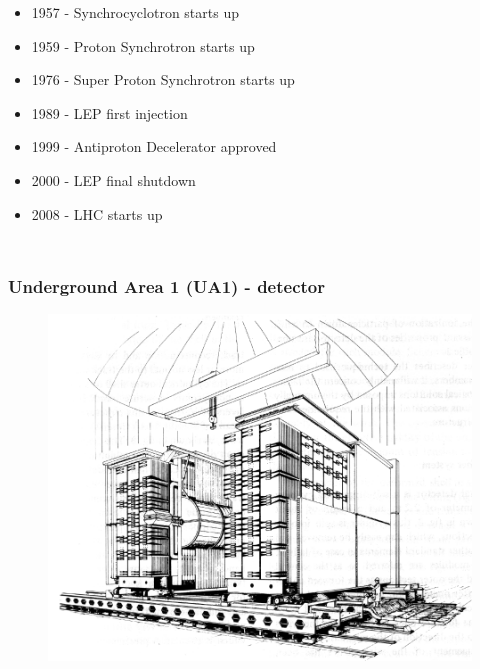 \documentclass[xcolor=table]{beamer}
\begin{document}
\begin{frame}
\begin{columns}
\begin{itemize}
\item 1957 - Synchrocyclotron starts up
\item 1959 - Proton Synchrotron starts up
\item 1976 - Super Proton Synchrotron starts up
\item 1989 - LEP first injection
\item 1999 - Antiproton Decelerator approved
\item 2000 - LEP final shutdown
\item 2008 - LHC starts up
\end{itemize}

\end{columns}


\end{frame}


\begin{frame}
\frametitle{Underground Area 1 (UA1) - detector}
\fontsize{9pt}{12}\selectfont

\begin{figure}[h]
\centering
\includegraphics[height=0.75\textheight]{images/ua1-overview.png}
\end{figure}

\end{frame}

\end{document}
